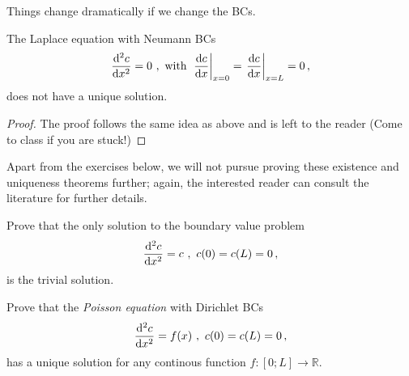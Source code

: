 \noindent Things change dramatically if we change the BCs. 
\begin{theorem}
  The Laplace equation with Neumann BCs
  \begin{equation}
    \frac{\mathrm{d}^2c}{\mathrm{d} x^2} = 0 \ , \ \text{with} \  
    \left.\frac{\mathrm{d} c}{\mathrm{d} x}\right|_{x=0}=\left.\frac{\mathrm{d} c}{\mathrm{d} x}\right|_{x=L} =0 \, ,   
  \end{equation}
  does not have a unique solution.
\end{theorem}

\begin{proof}
	The proof follows the same idea as above and is left to the reader 
	(Come to class if you are stuck!)
\end{proof}

Apart from the exercises below, we will not pursue proving these 
existence and uniqueness theorems further; again, the interested reader 
can consult the literature for further details. 

\begin{exerciseregion}
\begin{exercise}
  Prove that the only solution to the boundary value problem
  \begin{equation}
    \frac{\mathrm{d}^2c}{\mathrm{d} x^2} = c \ , \ c(0)=c(L)=0 \, ,
  \end{equation}
  is the trivial solution.
\end{exercise}

\begin{exercise}
	Prove that the \emph{Poisson equation}  with Dirichlet BCs
	\begin{equation}
	  \frac{\mathrm{d}^2c}{\mathrm{d} x^2} = f(x) \ , \ c(0)=c(L)=0 \, ,
	\end{equation}
	has a unique solution for any continous function $f: [0;L] \rightarrow \mathbb{R}$.
\end{exercise}

\end{exerciseregion}
 

